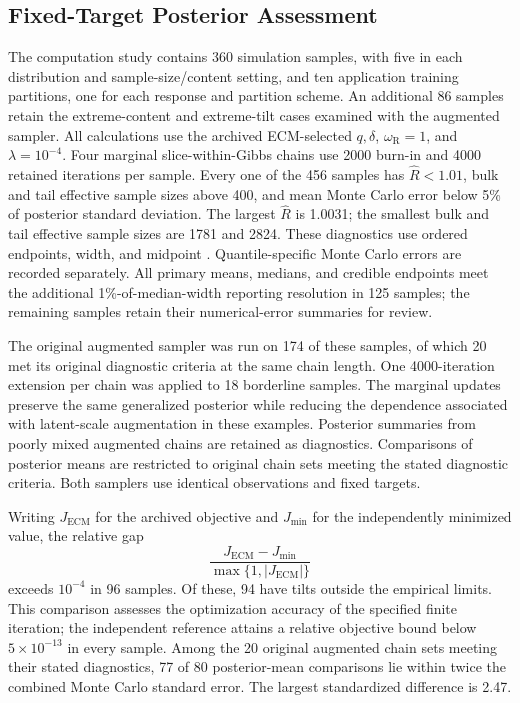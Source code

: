 \subsection{Fixed-Target Posterior Assessment}
\label{sec:supp-mti-posterior-assessment}
The computation study contains 360 simulation samples, with five in each
distribution and sample-size/content setting, and ten application training
partitions, one for each response and partition scheme. An additional 86
samples retain the extreme-content and extreme-tilt cases examined with
the augmented sampler. All calculations use the archived ECM-selected
\(q,\delta\), \(\omega_{\mathrm R}=1\), and \(\lambda=10^{-4}\).
Four marginal slice-within-Gibbs chains use 2000 burn-in and 4000 retained
iterations per sample. Every one of the 456 samples has \(\widehat R<1.01\),
bulk and tail effective sample sizes above 400, and mean Monte Carlo error
below 5\% of posterior standard deviation. The largest \(\widehat R\)
is 1.0031; the smallest bulk and tail effective sample sizes are 1781 and 2824.
These diagnostics use ordered endpoints, width, and midpoint
\citep{VehtariEtAl2021Rhat}. Quantile-specific Monte Carlo errors are
recorded separately. All primary means, medians, and credible endpoints
meet the additional 1\%-of-median-width reporting resolution in 125 samples;
the remaining samples retain their numerical-error summaries for review.

The original augmented sampler was run on 174 of these samples, of which
20 met its original diagnostic criteria at the same chain length. One
4000-iteration extension per chain was applied to 18 borderline samples.
The marginal updates preserve the same generalized posterior while reducing
the dependence associated with latent-scale augmentation in these examples.
Posterior summaries from poorly mixed augmented chains are retained as
diagnostics. Comparisons of posterior means are restricted to original
chain sets meeting the stated diagnostic criteria. Both samplers use
identical observations and fixed targets.

Writing \(J_{\mathrm{ECM}}\) for the archived objective and
\(J_{\min}\) for the independently minimized value, the relative gap
\[
\frac{J_{\mathrm{ECM}}-J_{\min}}{\max\{1,|J_{\mathrm{ECM}}|\}}
\]
exceeds \(10^{-4}\) in 96 samples.
Of these, 94 have tilts outside the empirical limits. This comparison
assesses the optimization accuracy of the specified finite iteration;
the independent reference attains a relative objective bound below
\(5\times10^{-13}\) in every sample. Among the 20 original augmented
chain sets meeting their stated diagnostics, 77 of 80 posterior-mean
comparisons lie within twice the combined Monte Carlo standard error.
The largest standardized difference is 2.47.

